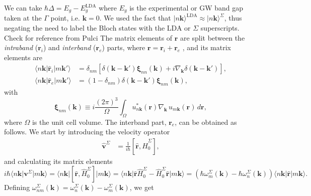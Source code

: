 We can take $\hbar\Delta = E_{g} -
E_{g}^\mathrm{LDA}$ where $E_{g}$ is the experimental or GW band gap taken at
the $\Gamma$ point, i.e. $\mathbf{k} = 0$. We used the fact that $\vert
n\mathbf{k}\rangle^\mathrm{LDA} \approx \vert n\mathbf{k}\rangle^\Sigma$, thus
negating the need to label the Bloch states with the LDA or $\Sigma$
superscripts.
{\color{red} Check for reference from Pulci}
The matrix elements of $\mathbf{r}$ are split between the
\emph{intraband} ($\mathbf{r}_{i}$) and \emph{interband} ($\mathbf{r}_{e}$)
parts, where $\mathbf{r} = \mathbf{r}_{i} + \mathbf{r}_{e}$
\cite{adamsJCP53, blountSSP62}, and its matrix elements are \cite{aversaPRB95}
\begin{align}\label{rnminn}
\langle n\mathbf{k}\vert \hat{\mathbf{r}}_{i} |m\mathbf{k}'\rangle 
&= \delta_{nm}
\left[
  \delta(\mathbf{k} - \mathbf{k}')\boldsymbol{\xi}_{nn}(\mathbf{k})
+ i\nabla_{\mathbf{k}}\delta(\mathbf{k} - \mathbf{k}')
\right],\\
\langle n\mathbf{k}| \hat{\mathbf{r}}_{e} |m\mathbf{k}'\rangle 
&= (1- \delta_{nm})\delta(\mathbf{k}-\mathbf{k}')
   \boldsymbol{\xi}_{nm}(\mathbf{k}),\label{rnmenn}
\end{align}
with
\begin{equation}\label{zetann}
\boldsymbol{\xi}_{nm}(\mathbf{k})
\equiv i\frac{(2\pi)^3}{\Omega}
\int_{\Omega}u^{*}_{n\mathbf{k}}(\mathbf{r})
\nabla_{\mathbf{k}}\,u_{m\mathbf{k}}(\mathbf{r})
\,d\mathbf{r},
\end{equation}
where $\Omega$ is the unit cell volume. The interband part, $\mathbf{r}_{e}$,
can be obtained as follows. We start by introducing the velocity operator
\begin{align}\label{vop}
\hat{\mathbf{v}}^{\Sigma} &=
\frac{1}{i\hbar}\left[\hat{\mathbf{r}},\hat{H}^{\Sigma}_{0}\right],
\end{align}
and calculating its matrix elements
\begin{equation}\label{conhrnm}
i\hbar\langle n\mathbf{k}\vert\mathbf{v}^\Sigma\vert m\mathbf{k}\rangle
= \langle n\mathbf{k}\vert
\left[
\hat{\mathbf{r}}, \hat{H}^{\Sigma}_{0}
\right]
  \vert m\mathbf{k}\rangle
= \langle n\mathbf{k}\vert
\hat{\mathbf{r}}\hat{H}^{\Sigma}_{0} - \hat{H}^{\Sigma}_{0}\hat{\mathbf{r}}
\vert m\mathbf{k}\rangle
=
\left(
\hbar\omega^{\Sigma}_{m}(\mathbf{k}) - \hbar\omega^{\Sigma}_{n}(\mathbf{k})
\right)
\langle n\mathbf{k}\vert\hat{\mathbf{r}}\vert m\mathbf{k}\rangle.
\end{equation}
Defining $\omega^\Sigma_{nm}(\mathbf{k}) =
\omega^{\Sigma}_{n}(\mathbf{k}) - \omega^\Sigma_m(\mathbf{k})$, we get
